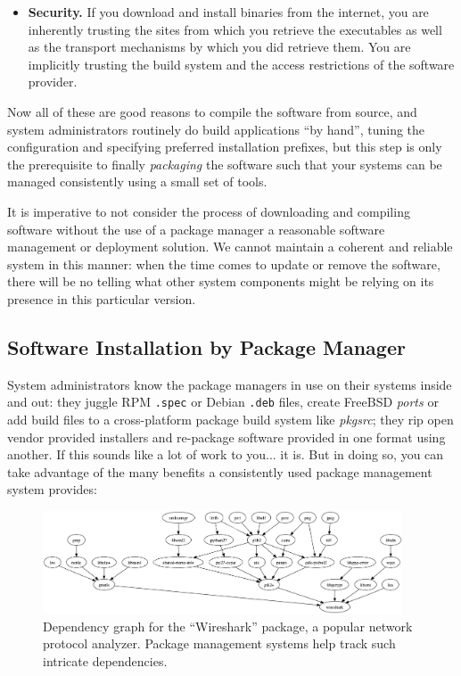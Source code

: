 \begin{itemize}
	\item {\bf Security.}  If you download and
		install binaries from the internet, you are inherently
		trusting the sites from which you retrieve the
		executables as well as the transport mechanisms by
		which you did retrieve them.  You are implicitly
		trusting the build system and the access restrictions
		of the software provider.
\end{itemize}

Now all of these are good reasons to compile the
software from source, and system administrators
routinely do build applications ``by hand'', tuning
the configuration and specifying preferred
installation prefixes, but this step is only the
prerequisite to finally {\em packaging} the software
such that your systems can be managed consistently
using a small set of tools.

It is imperative to not consider the process of
downloading and compiling software without the use of
a package manager a reasonable software management or
deployment solution.  We cannot maintain a coherent
and reliable system in this manner: when the time
comes to update or remove the software, there will be
no telling what other system components might be
relying on its presence in this particular version.

\subsection{Software Installation by Package Manager}
\label{software-installation:package-management:package-manager}

System administrators know the package managers in use
on their systems inside and out: they juggle
RPM {\tt .spec} or Debian {\tt .deb} files,
create FreeBSD {\em ports} or add
build files to a cross-platform package build system
like {\em pkgsrc}; they rip open vendor
provided installers and re-package software provided
in one format using another.  If this sounds like a
lot of work to you...  it is.  But in doing so, you
can take advantage of the many benefits a consistently
used package management system provides:

\begin{figure}[t]
	\centering
	\includegraphics[width=0.95\textwidth]{05/pics/wireshark-dependencies}
		\caption[Software Dependency Tree]{Dependency graph for
			the ``Wireshark'' package, a popular network
			protocol analyzer.
			Package management systems help track such
			intricate dependencies.
			\label{fig:os-installation:wireshark}}
\end{figure}


